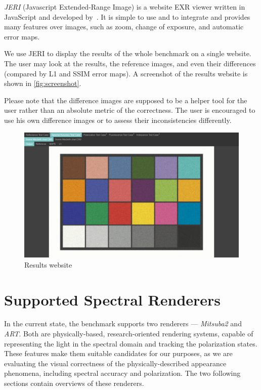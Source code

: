 \emph{JERI} (Javascript Extended-Range Image) is a website EXR viewer written in \\JavaScript and developed by~\citet{jeriWeb}. It is simple to use and to integrate and provides many features over images, such as zoom, change of exposure, and automatic error maps.

We use JERI to display the results of the whole benchmark on a single website. The user may look at the results, the reference images, and even their differences (compared by L1 and SSIM error maps). A screenshot of the results website is shown in \autoref{fig:screenshot}.

Please note that the difference images are supposed to be a helper tool for the user rather than an absolute metric of the correctness. The user is encouraged to use his own difference images or to assess their inconsistencies differently.

\begin{figure}
	\centering
	\includegraphics[width=\linewidth]{img/screenshot.png}
	\caption{Results website}
	\label{fig:screenshot}
\end{figure}

\section{Supported Spectral Renderers}

In the current state, the benchmark supports two renderers --- \emph{Mitsuba2} and \emph{ART}. Both are physically-based, research-oriented rendering systems, capable of representing the light in the spectral domain and tracking the polarization states. These features make them suitable candidates for our purposes, as we are evaluating the visual correctness of the physically-described appearance phenomena, including spectral accuracy and polarization. The two following sections contain overviews of these renderers.

